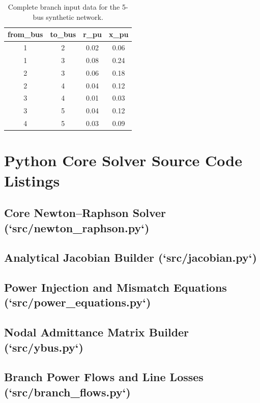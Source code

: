 \documentclass[12pt,a4paper,oneside]{report}
\begin{document}
\begin{table}[htbp]
\centering
\caption{Complete branch input data for the 5-bus synthetic network.}
\label{tab:app_5bus_lines}
\small
\begin{tabular}{cccc}
\toprule
\textbf{from\_bus} & \textbf{to\_bus} & \textbf{r\_pu} & \textbf{x\_pu} \\
\midrule
1 & 2 & 0.02 & 0.06 \\
1 & 3 & 0.08 & 0.24 \\
2 & 3 & 0.06 & 0.18 \\
2 & 4 & 0.04 & 0.12 \\
3 & 4 & 0.01 & 0.03 \\
3 & 5 & 0.04 & 0.12 \\
4 & 5 & 0.03 & 0.09 \\
\bottomrule
\end{tabular}
\end{table}

\chapter{Python Core Solver Source Code Listings}

\section{Core Newton--Raphson Solver (`src/newton\_raphson.py`)}


\section{Analytical Jacobian Builder (`src/jacobian.py`)}


\section{Power Injection and Mismatch Equations (`src/power\_equations.py`)}


\section{Nodal Admittance Matrix Builder (`src/ybus.py`)}


\section{Branch Power Flows and Line Losses (`src/branch\_flows.py`)}

\end{document}
